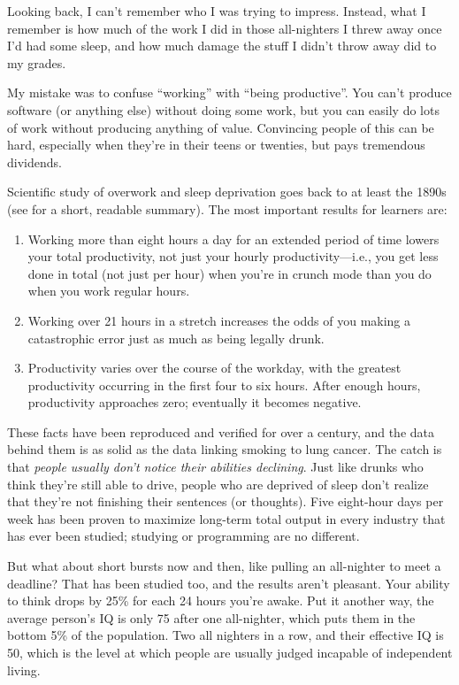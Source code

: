 Looking back, I can't remember who I was trying to impress.  Instead,
what I remember is how much of the work I did in those all-nighters I
threw away once I'd had some sleep, and how much damage the stuff I
didn't throw away did to my grades.

My mistake was to confuse ``working'' with ``being productive''.  You
can't produce software (or anything else) without doing some work, but
you can easily do lots of work without producing anything of value.
Convincing people of this can be hard, especially when they're in
their teens or twenties, but pays tremendous dividends.

Scientific study of overwork and sleep deprivation goes back to at
least the 1890s (see \cite{Robi2005} for a short, readable summary).
The most important results for learners are:

\begin{enumerate}

\item Working more than eight hours a day for an extended period of
  time lowers your total productivity, not just your hourly
  productivity---i.e., you get less done in total (not just per hour)
  when you're in crunch mode than you do when you work regular hours.

\item Working over 21 hours in a stretch increases the odds of you
  making a catastrophic error just as much as being legally drunk.

\item Productivity varies over the course of the workday, with the
  greatest productivity occurring in the first four to six hours.
  After enough hours, productivity approaches zero; eventually it
  becomes negative.

\end{enumerate}

These facts have been reproduced and verified for over a century, and
the data behind them is as solid as the data linking smoking to lung
cancer.  The catch is that \emph{people usually don't notice their
  abilities declining}.  Just like drunks who think they're still able
to drive, people who are deprived of sleep don't realize that they're
not finishing their sentences (or thoughts).  Five eight-hour days per
week has been proven to maximize long-term total output in every
industry that has ever been studied; studying or programming are no
different.

But what about short bursts now and then, like pulling an all-nighter
to meet a deadline?  That has been studied too, and the results aren't
pleasant.  Your ability to think drops by 25\% for each 24 hours
you're awake.  Put it another way, the average person's IQ is only 75
after one all-nighter, which puts them in the bottom 5\% of the
population.  Two all nighters in a row, and their effective IQ is 50,
which is the level at which people are usually judged incapable of
independent living.

